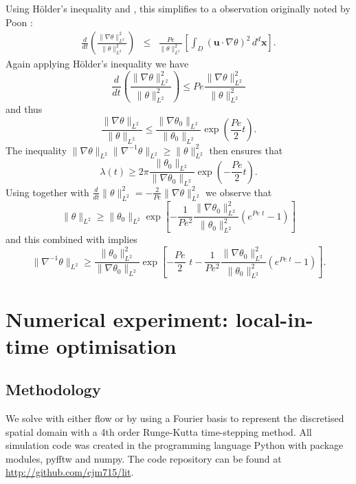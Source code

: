 \documentclass[12pt]{iopart}
\newcommand{\ddt}[1]{\frac{d #1}{dt}}
\newcommand{\hmone}[1]{\|\nabla^{-1} #1\|_{L^{2}}}
\newcommand{\ltwo}[1]{\|#1\|_{L^{2}}}
\newcommand{\hone}[1]{\| \nabla #1\|_{L^{2}}}
\newcommand{\sint}[1]{\int_{D} #1 \, d^{d}\mathbf{x}}
\renewcommand{\vec}[1]{\mathbf{#1}}
\newcommand{\pbrac}[1]{\left( #1 \right)}
\newcommand{\sbrac}[1]{\left[ #1 \right]}
\begin{document}
%
Using H\"older's inequality and , this simplifies to a observation originally noted by Poon \cite{Chi-Cheu1996}:
%
\begin{eqnarray}
	\ddt{} \pbrac{ \frac{\hone{\theta}^2}{\ltwo{\theta}^2} } 
			&\leq & \frac{Pe}{\ltwo{\theta}^2}
			\sbrac{
					 \sint{(\vec{u}\cdot \nabla \theta)^2} 
			}.
\end{eqnarray}
Again applying H\"older's inequality we have
\begin{equation}
\label{eq:k2growth_energy}
	\ddt{} 
		\pbrac{ 
			\frac{\hone{\theta}^2}{\ltwo{\theta}^2} 
		} 
		\leq  
		Pe
		\frac{\hone{\theta}^2}{\ltwo{\theta}^2} 
\end{equation}
%
and thus 
%
\begin{equation*}
		\frac{\hone{\theta}}{\ltwo{\theta}} 
		\leq  
		\frac{\hone{\theta_0}}{\ltwo{\theta_0}}
		\exp{\pbrac{\frac{Pe}{2} t}}.
\end{equation*}
%
The inequality $\hone{\theta}\hmone{\theta}\geq \ltwo{\theta}^2$ then ensures that
%
\begin{equation}
\label{eq:lambda_bound}
\lambda(t) \geq  2\pi\frac{\ltwo{\theta_0}}{\hone{\theta_0}}\exp{\pbrac{-\frac{Pe}{2}t}}.
\end{equation}
%
Using  together with  $\ddt{}\ltwo{\theta}^2 = -\frac{2}{Pe} \hone{\theta}^2$ we observe that
%
\begin{equation*}
\ltwo{\theta}\geq \ltwo{\theta_{0}}\exp\left[-\frac{1}{Pe^2}\frac{\hone{\theta_0}^2}{\ltwo{\theta_0}^2}\left(e^{Pe \, \, t}-1\right)\right]
\end{equation*}
%
and this combined with   implies
%
\begin{equation}
\hmone{\theta}\geq \frac{\ltwo{\theta_{0}}^2}{\hone{\theta_0}}\exp\left[-\frac{Pe}{2} \,\, t-\frac{1}{Pe^2}\frac{\hone{\theta_0}^2}{\ltwo{\theta_0}^2}\left(e^{Pe \,\, t}-1\right)\right].
\end{equation}


\section{Numerical experiment: local-in-time optimisation}
\label{sec:numerical_experiment}
\subsection{Methodology}


We solve  with either flow  or  by using a Fourier basis to represent the discretised spatial domain with a 4th order Runge-Kutta time-stepping method. All simulation code was created in the programming language Python with package modules, pyfftw and numpy. The code repository can be found at \href{http://github.com/cjm715/lit}{ http://github.com/cjm715/lit}.
\end{document}

